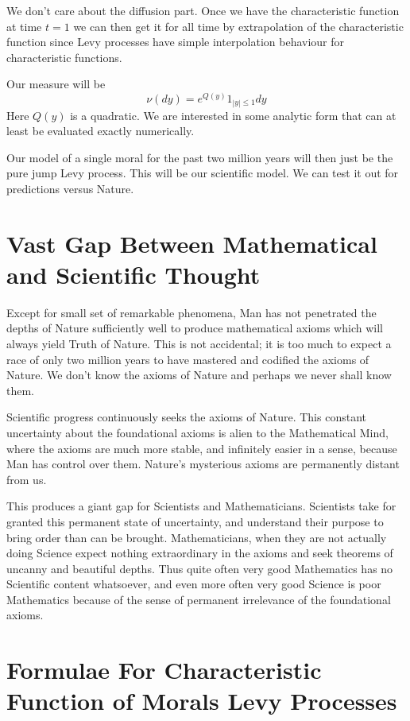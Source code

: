 \documentclass{amsart}
\begin{document}
We don't care about the diffusion part.  Once we have the characteristic function at time $t=1$ we can then get it for all time by extrapolation of the characteristic function since Levy processes have simple interpolation behaviour for characteristic functions.

Our measure will be 
\[
\nu(dy) = e^{Q(y)}1_{|y| \le 1} dy
\]
Here $Q(y)$ is a quadratic.  We are interested in some analytic form that can at least be evaluated exactly numerically. 

Our model of a single moral for the past two million years will then just be the pure jump Levy process.  This will be our scientific model.  We can test it out for predictions versus Nature.


\section{Vast Gap Between Mathematical and Scientific Thought}

Except for small set of remarkable phenomena, Man has not penetrated the depths of Nature sufficiently well to produce mathematical axioms which will always yield Truth of Nature.  This is not accidental; it is too much to expect a race of only two million years to have mastered and codified the axioms of Nature.  We don't know the axioms of Nature and perhaps we never shall know them.  

Scientific progress continuously seeks the axioms of Nature.  This constant uncertainty about the foundational axioms is alien to the Mathematical Mind, where the axioms are much more stable, and infinitely easier in a sense, because Man has control over them. Nature's mysterious axioms are permanently distant from us.  

This produces a giant gap for Scientists and Mathematicians.  Scientists take for granted this permanent state of uncertainty, and understand their purpose to bring order than can be brought.  Mathematicians, when they are not actually doing Science expect nothing extraordinary in the axioms and seek theorems of uncanny and beautiful depths.  Thus quite often very good Mathematics has no Scientific content whatsoever, and even more often very good Science is poor Mathematics because of the sense of permanent irrelevance of the foundational axioms.  

\section{Formulae For Characteristic Function of Morals Levy Processes}
\end{document}
